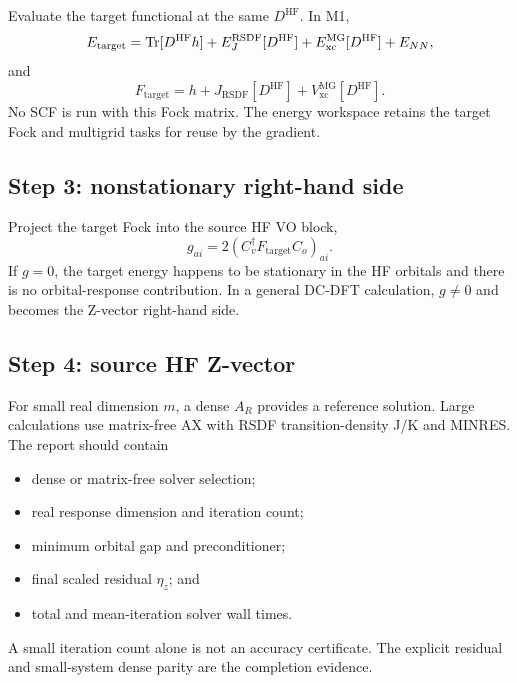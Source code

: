 Evaluate the target functional at the same $D^{\mathrm{HF}}$.  In M1,
\begin{equation}
  E_{\mathrm{target}}
  =\operatorname{Tr}[D^{\mathrm{HF}}h]+E_J^{\mathrm{RSDF}}[D^{\mathrm{HF}}]
   +E_{\mathrm{xc}}^{\mathrm{MG}}[D^{\mathrm{HF}}]+E_{NN},
\end{equation}
and
\begin{equation}
  F_{\mathrm{target}}
  =h+J_{\mathrm{RSDF}}[D^{\mathrm{HF}}]
    +V_{\mathrm{xc}}^{\mathrm{MG}}[D^{\mathrm{HF}}].
\end{equation}
No SCF is run with this Fock matrix.  The energy workspace retains the target
Fock and multigrid tasks for reuse by the gradient.

\subsection{Step 3: nonstationary right-hand side}

Project the target Fock into the source HF VO block,
\begin{equation}
  g_{ai}=2(C_v^\dagger F_{\mathrm{target}}C_o)_{ai}.
\end{equation}
If $g=0$, the target energy happens to be stationary in the HF orbitals and
there is no orbital-response contribution.  In a general DC-DFT calculation,
$g\ne0$ and becomes the Z-vector right-hand side.

\subsection{Step 4: source HF Z-vector}

For small real dimension $m$, a dense $A_R$ provides a reference solution.
Large calculations use matrix-free AX with RSDF transition-density J/K and
MINRES.  The report should contain
\begin{itemize}
  \item dense or matrix-free solver selection;
  \item real response dimension and iteration count;
  \item minimum orbital gap and preconditioner;
  \item final scaled residual $\eta_z$; and
  \item total and mean-iteration solver wall times.
\end{itemize}
A small iteration count alone is not an accuracy certificate.  The explicit
residual and small-system dense parity are the completion evidence.

